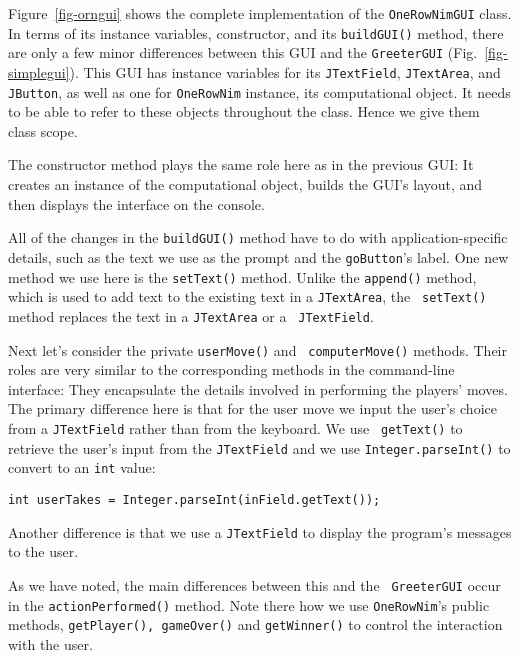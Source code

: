 Figure~\ref{fig-orngui} shows the complete implementation of the
{\tt OneRowNimGUI} class. In terms of its instance variables,
constructor, and its {\tt buildGUI()} method, there are only a few
minor differences between this GUI and the {\tt GreeterGUI}
(Fig.~\ref{fig-simplegui}). This GUI has instance variables
for its {\tt JTextField}, {\tt JTextArea}, and {\tt JButton}, as
well as one for {\tt OneRowNim} instance, its computational object. It
needs to be able to refer to these objects throughout the class. 
Hence we give them class scope. 

The constructor method plays the same role here as in the previous
GUI: It creates an instance of the computational object, builds the
GUI's layout, and then displays the interface on the console.

All of the changes in the {\tt buildGUI()} method have to do with
application-specific details, such as the text we use as the prompt
and the {\tt goButton}'s label.  One new method we use here is the
{\tt setText()} method. Unlike the {\tt append()} method, which is
used to add text to the existing text in a {\tt JTextArea}, the {\tt
setText()} method replaces the text in a {\tt JTextArea} or a {\tt
JTextField}.

Next let's consider the private {\tt userMove()} and {\tt
computerMove()} methods.  Their roles are very similar to the
corresponding methods in the command-line interface: They encapsulate
the details involved in performing the players' moves. The primary
difference here is that for the user move we input the user's choice
from a {\tt JTextField} rather than from the keyboard. We use {\tt
getText()} to retrieve the user's input from the {\tt JTextField} and
we use {\tt Integer.parseInt()} to convert to an {\tt int} value:

\begin{jjjlisting}
\begin{lstlisting}
int userTakes = Integer.parseInt(inField.getText());
\end{lstlisting}
\end{jjjlisting}

\noindent Another difference is that we use a {\tt JTextField} to display
the program's messages to the user.

As we have noted, the main differences between this and the {\tt
GreeterGUI} occur in the {\tt actionPerformed()} method.  Note there
how we use {\tt OneRowNim}'s public methods, {\tt getPlayer(),
gameOver()} and {\tt getWinner()} to control the interaction with the
user. 

